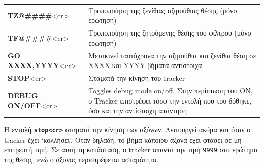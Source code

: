 \documentclass[
  a4paper,
  twoside,
  titlepage,
  12pt]{article}
\numberwithin{equation}{section}
\numberwithin{figure}{section}
\numberwithin{table}{section}
\begin{document}
\begin{longtable}[]{@{}
  >{\raggedleft\arraybackslash}p{}
  >{\raggedright\arraybackslash}p{}@{}}
\textbf{TZ@\#\#\#\#}\textless cr\textgreater{} & Τροποποίηση της ζενίθιας αζιμούθιας θέσης (μόνο ερώτηση) \\
\textbf{TF@\#\#\#\#}\textless cr\textgreater{} & Τροποποίηση της ζητούμενης θέσης του φίλτρου (μόνο ερώτηση) \\
\textbf{GO XXXX,YYYY}\textless cr\textgreater{} & Μετακινεί ταυτόχρονα την αζιμούθια και ζενίθια θέση σε XXXX και YYYY βήματα αντίστοιχα \\
\textbf{STOP}\textless cr\textgreater{} & Σταματά την κίνηση του tracker \\
\textbf{DEBUG ON/OFF}\textless cr\textgreater{} & Toggles debug mode on/off. Στην περίπτωση του ON, ο Tracker επιστρέφει τόσο την εντολή που του δόθηκε, όσο και την αντίστοιχη απάντηση \\
\bottomrule()
\end{longtable}

\normalsize

Η εντολή \textbf{\texttt{stop\textless{}cr\textgreater{}}} σταματά την κίνηση των αξόνων. Λειτουργεί ακόμα και όταν ο tracker έχει `κολλήσει'. Όταν δηλαδή, το βήμα κάποιου άξονα έχει φτάσει σε μη επιτρεπτή τιμή. Σε αυτή τη κατάσταση, ο tracker απαντά την τιμή \texttt{9999} στο ερώτημα της θέσης, ενώ ο άξονας περιστρέφεται ασταμάτητα.

\footnotesize
\end{document}
